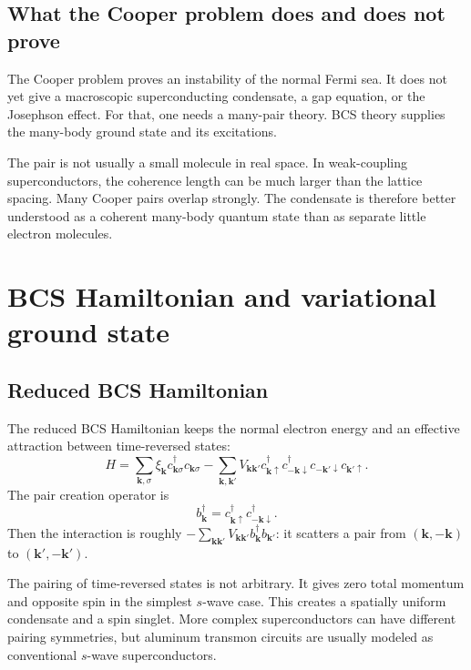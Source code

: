 \documentclass[11pt]{article}
\newcommand{\bk}{{\bm{k}}}
\begin{document}
\subsection{What the Cooper problem does and does not prove}
The Cooper problem proves an instability of the normal Fermi sea. It does not yet give a macroscopic superconducting condensate, a gap equation, or the Josephson effect. For that, one needs a many-pair theory. BCS theory supplies the many-body ground state and its excitations.

The pair is not usually a small molecule in real space. In weak-coupling superconductors, the coherence length can be much larger than the lattice spacing. Many Cooper pairs overlap strongly. The condensate is therefore better understood as a coherent many-body quantum state than as separate little electron molecules.

\section{BCS Hamiltonian and variational ground state}

\subsection{Reduced BCS Hamiltonian}
The reduced BCS Hamiltonian keeps the normal electron energy and an effective attraction between time-reversed states:
\begin{equation}
H=\sum_{\bk,\sigma}\xi_\bk c_{\bk\sigma}^{\dagger}c_{\bk\sigma}
-\sum_{\bk,\bk'}V_{\bk\bk'}c_{\bk\uparrow}^{\dagger}c_{-\bk\downarrow}^{\dagger}c_{-\bk'\downarrow}c_{\bk'\uparrow}.
\end{equation}
The pair creation operator is
\begin{equation}
 b_\bk^{\dagger}=c_{\bk\uparrow}^{\dagger}c_{-\bk\downarrow}^{\dagger}.
\end{equation}
Then the interaction is roughly $-\sum_{\bk\bk'}V_{\bk\bk'}b_\bk^{\dagger}b_{\bk'}$: it scatters a pair from $(\bk,-\bk)$ to $(\bk',-\bk')$.

The pairing of time-reversed states is not arbitrary. It gives zero total momentum and opposite spin in the simplest $s$-wave case. This creates a spatially uniform condensate and a spin singlet. More complex superconductors can have different pairing symmetries, but aluminum transmon circuits are usually modeled as conventional $s$-wave superconductors.
\end{document}
